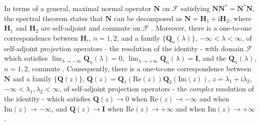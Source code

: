 \documentclass[11pt]{amsart}
\newcommand{\I}{\mathrm{i}}
\newcommand{\Hb}{\mathbf{H}}
\newcommand{\Ib}{\mathbf{I}}
\newcommand{\Qb}{\mathbf{Q}}
\newcommand{\Nb}{\mathbf{N}}
\newcommand{\Fs}{\mathscr{F}}
\begin{document}
In terms of a general, maximal normal operator $\Nb$ on $\Fs$
satisfying $\Nb\Nb^*=\Nb^*\Nb$, the spectral theorem states that $\Nb$ can
be decomposed as $\Nb=\Hb_1+\I\Hb_2$, where $\Hb_1$ and $\Hb_2$ are
self-adjoint and commute on $\Fs$ \cite{Stone:64}. Moreover, there is
a one-to-one correspondence between $\Hb_i$, $n=1,2$, and a family
$\{\Qb_n(\lambda)\}$, $-\infty<\lambda<\infty$, of self-adjoint projection operators - the
resolution of the identity - with domain $\Fs$ which satisfies
$\lim_{\lambda\to-\infty}\Qb_n(\lambda)=0$, $\lim_{\lambda\to+\infty}\Qb_n(\lambda)=\Ib$, and the
$\Qb_n(\lambda)$, $n=1,2$, commute \cite{Reed-1980,Stone:64}. Consequently,
there is a one-to-one correspondence between $\Nb$ and a family
$\{\Qb(z)\}$, 
$\Qb(z)=\Qb_1(\text{Re}(z))\Qb_2(\text{Im}(z))$, $z=\lambda_1+\I\lambda_2$,
$-\infty<\lambda_1,\lambda_2<\infty$, of self-adjoint projection operators - the
\emph{complex} resolution of the identity - which satisfies $\Qb(z)\to0$
when $\text{Re}(z)\to-\infty$  and when $\text{Im}(z)\to-\infty$, and $\Qb(z)\to\Ib$
when $\text{Re}(z)\to+\infty$ and when $\text{Im}(z)\to+\infty$ \cite{Stone:64}.
\end{document}
